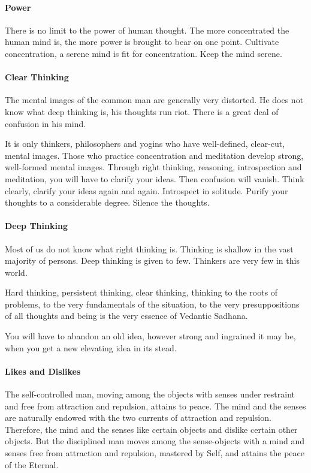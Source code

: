 \paragraph{Power}
There is no limit to the power of human thought. The more concentrated the human mind is, the more power is brought to bear on one point. Cultivate concentration, a serene mind is fit for concentration. Keep the mind serene.

\paragraph{Clear Thinking}
The mental images of the common man are generally very distorted. He does not know what deep thinking is, his thoughts run riot. There is a great deal of confusion in his mind.

It is only thinkers, philosophers and yogins who have well-defined, clear-cut, mental images. Those who practice concentration and meditation develop strong, well-formed mental images. Through right thinking, reasoning, introspection and meditation, you will have to clarify your ideas. Then confusion will vanish. Think clearly, clarify your ideas again and again. Introspect in solitude. Purify your thoughts to a considerable degree. Silence the thoughts.

\paragraph{Deep Thinking}
Most of us do not know what right thinking is. Thinking is shallow in the vast majority of persons. Deep thinking is given to few. Thinkers are very few in this world.

Hard thinking, persistent thinking, clear thinking, thinking to the roots of problems, to the very fundamentals of the situation, to the very presuppositions of all thoughts and being is the very essence of Vedantic Sadhana.

You will have to abandon an old idea, however strong and ingrained it may be, when you get a new elevating idea in its stead.

\paragraph{Likes and Dislikes}
The self-controlled man, moving among the objects with senses under restraint and free from attraction and repulsion, attains to peace. The mind and the senses are naturally endowed with the two currents of attraction and repulsion. Therefore, the mind and the senses like certain objects and dislike certain other objects. But the disciplined man moves among the sense-objects with a mind and senses free from attraction and repulsion, mastered by Self, and attains the peace of the Eternal.

